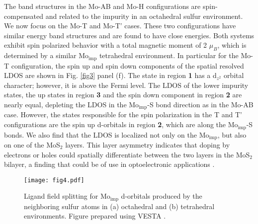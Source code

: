 \documentclass[pra,twocolumn,preprintnumbers,amsmath,amssymb]{revtex4}
\begin{document}
The band structures in the Mo-AB and Mo-H configurations are spin-compensated and related to the impurity in an octahedral sulfur environment.
We now focus on the Mo-T and Mo-T' cases. These two configurations have similar energy band structures and are found to have close energies. Both systems exhibit spin polarized behavior with a total magnetic moment of 2 ${\mu_{B}}$, which is determined by a similar Mo$_\mathrm{imp}$ tetrahedral environment.
In particular for the Mo-T configuration, the spin up and spin down components of the spatial resolved LDOS are shown in Fig. \ref{fig3} panel (f).
The state in region \textbf{1} has a d$_{z^{2}}$ orbital character; however, it is above the Fermi level.
The LDOS of the lower impurity states, the up states in region \textbf{3} and the spin down
component in region \textbf{2} are nearly equal, depleting the LDOS in the
Mo$_\mathrm{imp}$-S bond direction as in the Mo-AB case.
%
%
However, the states responsible for the spin polarization in the T and T'
configurations are the spin up d-orbitals in region \textbf{2}, which are along the
Mo$_\mathrm{imp}$-S bonds.
%
We also find that the LDOS is localized not only on the Mo$_\mathrm{imp}$, but also on one of the MoS$_{2}$ layers.
This layer asymmetry indicates that doping by electrons or holes could spatially differentiate between the two
layers in the MoS$_{2}$ bilayer, a finding that could be of use in optoelectronic applications \cite{hong2014ultrafast,kosmider2013electronic}.


\begin{figure}[ht]
\centering
\texttt{[image: fig4.pdf]}
\caption{Ligand field splitting for Mo$_\mathrm{imp}$ d-orbitals produced by the neighboring sulfur atoms in (a) octahedral and (b) tetrahedral environments. Figure prepared using VESTA \cite{vesta}.} \label{fig4}
\end{figure}
\end{document}
